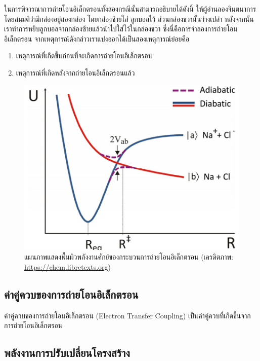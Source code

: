 ในการพิจารณาการถ่ายโอนอิเล็กตรอนทั้งสองกรณีนั้นสามารถอธิบายได้ดังนี้ ให้ผู้อ่านลองจินตนาการโดยสมมติว่ามีกล่องอยู่สองกล่อง โดยกล่องซ้ายใส่%
ลูกบอลไว้ ส่วนกล่องขวานั้นว่างเปล่า หลังจากนั้นเราทำการหยิบลูกบอลจากกล่องซ้ายแล้วนำไปใส่ไว้ในกล่องขวา ซึ่งนี่คือการจำลองการถ่ายโอนอิเล็กตรอน 
จากเหตุการณ์ดังกล่าวเราแบ่งออกได้เป็นสองเหตุการณ์ย่อยคือ

\begin{enumerate}
    \item เหตุการณ์ที่เกิดขึ้นก่อนที่จะเกิดการถ่ายโอนอิเล็กตรอน
    
    \item เหตุการณ์ที่เกิดหลังจากถ่ายโอนอิเล็กตรอนแล้ว
\end{enumerate}

\begin{figure}[htbp]
    \centering
    \includegraphics[width=0.7\linewidth]{fig/et_diagram.png}
    \caption{แผนภาพแสดงพื้นผิวพลังงานศักย์ของกระบวนการถ่ายโอนอิเล็กตรอน (เครดิตภาพ: \url{https://chem.libretexts.org})}
    \label{fig:et_diagram}
\end{figure}

\subsection{ค่าคู่ควบของการถ่ายโอนอิเล็กตรอน}
\label{ssec:et_coupling}

ค่าคู่ควบของการถ่ายโอนอิเล็กตรอน (Electron Transfer Coupling) เป็นค่าคู่ควบที่เกิดขึ้นจากการถ่ายโอนอิเล็กตรอน

\subsection{พลังงานการปรับเปลี่ยนโครงสร้าง}
\label{ssec:reor_ener}

